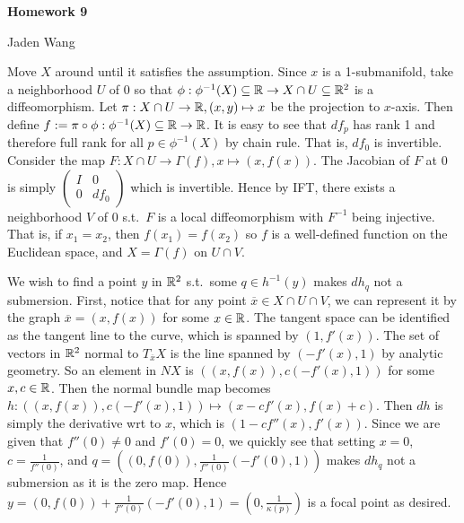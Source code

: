 \documentclass[12pt]{article}
\begin{document}
\centerline {\textsf{\textbf{\LARGE{Homework 9}}}}
\centerline {Jaden Wang}
\vspace{.15in}
\begin{problem}[2.3.11]
	Move $ X$ around until it satisfies the assumption.  Since $ x$ is a 1-submanifold,  take a neighborhood $ U$ of $ 0$ so that $ \phi: \phi ^{-1}(X) \subseteq \mathbb{R} \to X \cap U \subseteq \mathbb{R}^2$ is a diffeomorphism. Let $ \pi: X \cap U \to \mathbb{R}, (x,y)\mapsto x$ be the projection to $ x$-axis. Then define $f:= \pi \circ \phi: \phi ^{-1}(X) \subseteq \mathbb{R} \to \mathbb{R}$. It is easy to see that $ df_p$ has rank 1 and therefore full rank for all  $ p \in \phi ^{-1}(X)$ by chain rule. That is, $ df_0$ is invertible. Consider the map $ F:X \cap U \to \Gamma(f),x\mapsto (x,f(x))$. The Jacobian of $ F$ at $ 0$ is simply $ \begin{pmatrix} I&0\\0&df_0 \end{pmatrix} $ which is invertible. Hence by IFT, there exists a neighborhood $ V$ of  $ 0$  s.t.\ $ F$ is a local diffeomorphism with $ F^{-1}$ being injective. That is, if  $ x_1 = x_2$, then $ f(x_1) = f(x_2)$ so $ f$ is a well-defined function on the Euclidean space, and  $ X= \Gamma(f)$ on $ U \cap V$.

	We wish to find a point $ y$ in $ \mathbb{R}^2$ s.t.\ some $ q \in h^{-1}(y)$ makes $ dh_q $ not a submersion. First, notice that for any point $\overline{x} \in X \cap U \cap V$, we can represent it by the graph $\overline{x}= (x,f(x))$ for some $ x \in \mathbb{R}$. The tangent space can be identified as the tangent line to the curve, which is spanned by $ (1,f'(x))$. The set of vectors in $ \mathbb{R}^2$ normal to $ T_{\overline{x}}X$ is the line spanned by $ (-f'(x),1)$ by analytic geometry. So an element in $ NX$ is  $ ((x,f(x)),c(-f'(x),1))$ for some  $x, c \in \mathbb{R}$. Then the normal bundle map becomes $ h: ((x,f(x)),c(-f'(x),1)) \mapsto (x-cf'(x),f(x)+c)$. Then $ dh$ is simply the derivative wrt to $ x$, which is $ (1-cf''(x),f'(x))$. Since we are given that $ f''(0)\neq 0$ and $ f'(0)=0$, we quickly see that setting $ x=0$, $c=\frac{1}{f''(0)} $, and $q= ((0,f(0)),\frac{1}{f''(0)}(-f'(0),1))$ makes $ dh_q$ not a submersion as it is the zero map. Hence  $ y=(0,f(0))+\frac{1}{f''(0)}(-f'(0),1) = (0,\frac{1}{ \kappa(p)})$ is a focal point as desired.
\end{problem}
\end{document}
